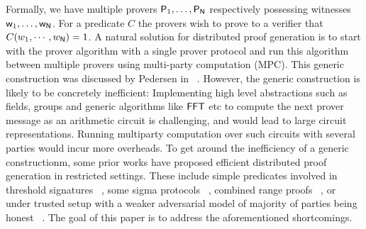 Formally, we have multiple provers $\mathsf{P}_1, \ldots, \mathsf{P}_{\mathsf{N}}$
respectively possessing witnesses $\mathsf{w}_1, \ldots, \mathsf{w}_{\mathsf{N}}$. For a predicate
$C$ the provers wish to prove to a verifier that $C(w_1,\cdots,w_{\mathsf{N}}) = 1$.  
A natural solution for distributed
proof generation is to start with the prover algorithm with a single prover
protocol and run this algorithm between multiple provers using multi-party
computation (MPC). This generic construction was discussed by Pedersen in
~\cite{Ped92}. However, the generic construction is likely to be concretely
inefficient: Implementing high level abstractions such as fields, groups and
generic algorithms like $\mathsf{FFT}$ etc to compute the next prover message as an
arithmetic circuit is challenging, and would lead to large circuit
representations. Running multiparty computation over such circuits with several
parties would incur more overheads.
To get around the inefficiency of a generic constructionm, some prior works have
proposed efficient distributed proof generation in restricted settings. These
include simple predicates involved in threshold signatures ~\cite{DDS}, some
sigma protocols ~\cite{EfficientTZ}, combined range proofs ~\cite{bulletproofs},
or under trusted setup with a weaker adversarial model of majority of parties
being honest ~\cite{trinocchio}. The goal of this paper is to address the
aforementioned shortcomings.

